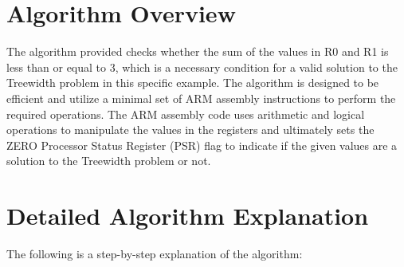 \section{Algorithm Overview}
The algorithm provided checks whether the sum of the values in R0 and R1 is less than or equal to 3, which is a necessary condition for a valid solution to the Treewidth problem in this specific example. The algorithm is designed to be efficient and utilize a minimal set of ARM assembly instructions to perform the required operations. The ARM assembly code uses arithmetic and logical operations to manipulate the values in the registers and ultimately sets the ZERO Processor Status Register (PSR) flag to indicate if the given values are a solution to the Treewidth problem or not. 

\section{Detailed Algorithm Explanation}
The following is a step-by-step explanation of the algorithm:

